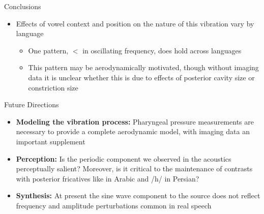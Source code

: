 \documentclass[final]{beamer}
\newlength{\onecolwid}
\begin{document}
\begin{frame}[t]
\begin{columns}[t]
\begin{column}{\onecolwid}
\begin{block}{Conclusions}
\begin{itemize}
    \item Effects of vowel context and position on the nature of this vibration vary by language

      \begin{itemize}

        \item One pattern,  $<$  in oscillating frequency, does hold across languages
        \item This pattern may be aerodynamically motivated, though without imaging data it is unclear whether this is due to effects of posterior cavity size or constriction size
      \end{itemize}
  \end{itemize}

\end{block}


\begin{block}{Future Directions}
  \begin{itemize}
    \item \textbf{Modeling the vibration process:} Pharyngeal pressure measurements are necessary to provide a complete aerodynamic model, with imaging data an important supplement
    \item \textbf{Perception:} Is the periodic component we observed in the acoustics perceptually salient? Moreover, is it critical to the maintenance of contrasts with posterior fricatives like  in Arabic and /h/ in Persian?
    \item \textbf{Synthesis:} At present the sine wave component to the source does not reflect frequency and amplitude perturbations common in real speech
  \end{itemize}
\end{block}




\end{column}
\end{columns}
\end{frame}
\end{document}
